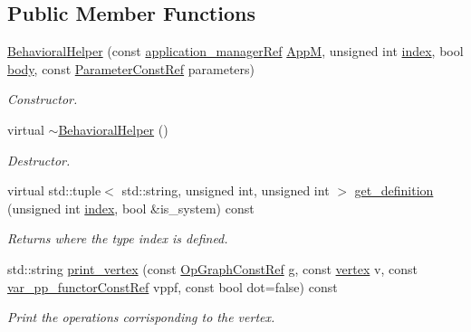\subsection*{Public Member Functions}
\begin{DoxyCompactItemize}
\item 
\hyperlink{classBehavioralHelper_ac80988de2f81cb9392beae59b1068542}{Behavioral\+Helper} (const \hyperlink{application__manager_8hpp_a04ccad4e5ee401e8934306672082c180}{application\+\_\+manager\+Ref} \hyperlink{classBehavioralHelper_a5709449513c415e3f005344f354e6760}{AppM}, unsigned int \hyperlink{tutorial__pact__2019_2Introduction_2third_2include_2Keccak_8h_a028c9bdc8344cca38ab522a337074797}{index}, bool \hyperlink{classBehavioralHelper_a6692a8e5606563e9a6f7a021f91b53aa}{body}, const \hyperlink{Parameter_8hpp_a37841774a6fcb479b597fdf8955eb4ea}{Parameter\+Const\+Ref} parameters)
\begin{DoxyCompactList}\small\item\em Constructor. \end{DoxyCompactList}\item 
virtual \hyperlink{classBehavioralHelper_a5cf976c4c31781dc5348f829f2ee734d}{$\sim$\+Behavioral\+Helper} ()
\begin{DoxyCompactList}\small\item\em Destructor. \end{DoxyCompactList}\item 
virtual std\+::tuple$<$ std\+::string, unsigned int, unsigned int $>$ \hyperlink{classBehavioralHelper_a3cc24dd0e8e6e4e37fe28f18f73407bd}{get\+\_\+definition} (unsigned int \hyperlink{tutorial__pact__2019_2Introduction_2third_2include_2Keccak_8h_a028c9bdc8344cca38ab522a337074797}{index}, bool \&is\+\_\+system) const
\begin{DoxyCompactList}\small\item\em Returns where the type index is defined. \end{DoxyCompactList}\item 
std\+::string \hyperlink{classBehavioralHelper_ac4cf5e71318df6a6adf0685540cbb22b}{print\+\_\+vertex} (const \hyperlink{op__graph_8hpp_a9a0b240622c47584bee6951a6f5de746}{Op\+Graph\+Const\+Ref} g, const \hyperlink{graph_8hpp_abefdcf0544e601805af44eca032cca14}{vertex} v, const \hyperlink{var__pp__functor_8hpp_a8a6b51b6519401d911398943510557f0}{var\+\_\+pp\+\_\+functor\+Const\+Ref} vppf, const bool dot=false) const
\begin{DoxyCompactList}\small\item\em Print the operations corrisponding to the vertex. \end{DoxyCompactList}\item 

\end{DoxyCompactItemize}
